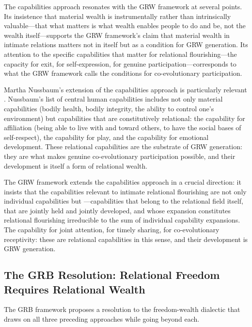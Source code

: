 The capabilities approach resonates with the GRW framework at several points. Its insistence that material wealth is instrumentally rather than intrinsically valuable---that what matters is what wealth enables people to do and be, not the wealth itself---supports the GRW framework's claim that material wealth in intimate relations matters not in itself but as a condition for GRW generation. Its attention to the specific capabilities that matter for relational flourishing---the capacity for exit, for self-expression, for genuine participation---corresponds to what the GRW framework calls the conditions for co-evolutionary participation.

Martha Nussbaum's extension of the capabilities approach is particularly relevant \parencite{held2006}. Nussbaum's list of central human capabilities includes not only material capabilities (bodily health, bodily integrity, the ability to control one's environment) but capabilities that are constitutively relational: the capability for affiliation (being able to live with and toward others, to have the social bases of self-respect), the capability for play, and the capability for emotional development. These relational capabilities are the substrate of GRW generation: they are what makes genuine co-evolutionary participation possible, and their development is itself a form of relational wealth.

The GRW framework extends the capabilities approach in a crucial direction: it insists that the capabilities relevant to intimate relational flourishing are not only individual capabilities but ---capabilities that belong to the relational field itself, that are jointly held and jointly developed, and whose expansion constitutes relational flourishing irreducible to the sum of individual capability expansions. The capability for joint attention, for timely sharing, for co-evolutionary receptivity: these are relational capabilities in this sense, and their development is GRW generation.

\subsection{The GRB Resolution: Relational Freedom Requires Relational Wealth}
\label{p15:subsec:grb_resolution}

\noindent
The GRB framework proposes a resolution to the freedom-wealth dialectic that draws on all three preceding approaches while going beyond each.

